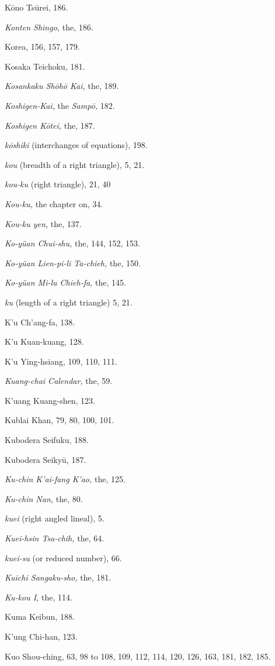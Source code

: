 \documentclass[11pt]{article}
\begin{document}
Kōno Tsūrei, 186.\par
\emph{Konten Shingo,} the, 186.\par
Korea, 156, 157, 179.\par
Kosaka Teichoku, 181.\par
\emph{Kosankaku Shōhō Kai,} the, 189.\par
\emph{Koshigen-Kai,} the \emph{Sampō,} 182.\par
\emph{Koshigen Kōtei,} the, 187.\par
\emph{kōshiki} (interchanges of equations), 198.\par
\emph{kou} (breadth of a right triangle), 5, 21.\par
\emph{kou-ku} (right triangle), 21, 40\par
\emph{Kou-ku,} the chapter on, 34.\par
\emph{Kou-ku yen,} the, 137.\par
\emph{Ko-yüan Chui-shu,} the, 144, 152, 153.\par
\emph{Ko-yüan Lien-pi-li Ta-chieh,} the, 150.\par
\emph{Ko-yüan Mi-lu Chieh-fa,} the, 145.\par
\emph{ku} (length of a right triangle) 5, 21.\par
K'u Ch'ang-fa, 138.\par
K'u Kuan-kuang, 128.\par
K'u Ying-hsiang, 109, 110, 111.\par
\emph{Kuang-chai Calendar,} the, 59.\par
K'uang Kuang-shen, 123.\par
Kublai Khan, 79, 80, 100, 101.\par
Kubodera Seifuku, 188.\par
Kubodera Seikyū, 187.\par
\emph{Ku-chin K'ai-fang K'ao,} the, 125.\par
\emph{Ku-chin Nan,} the, 80.\par
\emph{kuei} (right angled lineal), 5.\par
\emph{Kuei-hsin Tsa-chih,} the, 64.\par
\emph{kuei-su} (or reduced number), 66.\par
\emph{Kuichi Sangaku-sho,} the, 181.\par
\emph{Ku-kou I,} the, 114.\par
Kuma Keibun, 188.\par
K'ung Chi-han, 123.\par
Kuo Shou-ching, 63, 98 to 108, 109, 112, 114, 120, 126, 163, 181, 182, 185.\par
\end{document}

